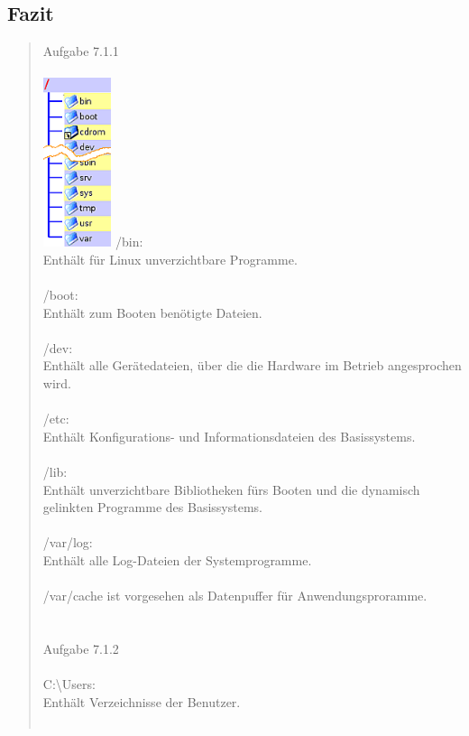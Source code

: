 	\subsection{Fazit}
		\begin{quote}
			Aufgabe 7.1.1\\ \\
			\includegraphics[width=2.0cm]{images/linux_verzeichnisstruktur}
			/bin:\\
			Enth\"alt f\"ur Linux unverzichtbare Programme.\\ \\
			/boot:\\
			Enth\"alt zum Booten benötigte Dateien.\\ \\
			/dev:\\
			Enth\"alt alle Gerätedateien, \"uber die die Hardware im Betrieb angesprochen wird.\\ \\
			/etc:\\
			Enth\"alt Konfigurations- und Informationsdateien des Basissystems.\\ \\
			/lib:\\
			Enth\"alt unverzichtbare Bibliotheken fürs Booten und die dynamisch gelinkten Programme des Basissystems.\\ \\
			/var/log:\\
			Enth\"alt alle Log-Dateien der Systemprogramme.\\ \\
			/var/cache ist vorgesehen als Datenpuffer für Anwendungsproramme.\\ \\ \\
			Aufgabe 7.1.2\\ \\
			C:\textbackslash Users:\\
			Enth\"alt Verzeichnisse der Benutzer.\\ \\

\end{quote}
